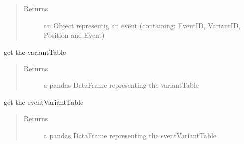 \documentclass[letterpaper,10pt,english]{sphinxmanual}
\begin{document}
\begin{fulllineitems}
\begin{fulllineitems}
\begin{quote}
\begin{description}
\item[{Returns}] \leavevmode
an Object representig an event (containing:  EventID, VariantID, Position and Event)

\end{description}\end{quote}

\end{fulllineitems}


\begin{fulllineitems}
\label{\detokenize{preprocessing:eventLogProcessing.DBTool.DBTool.getVariantTable}}
get the variantTable
\begin{quote}\begin{description}
\item[{Returns}] \leavevmode
a pandas DataFrame representing the variantTable

\end{description}\end{quote}

\end{fulllineitems}


\begin{fulllineitems}
\label{\detokenize{preprocessing:eventLogProcessing.DBTool.DBTool.getEventVariantTable}}
get the eventVariantTable
\begin{quote}\begin{description}
\item[{Returns}] \leavevmode
a pandas DataFrame representing the eventVariantTable

\end{description}\end{quote}

\end{fulllineitems}


\end{fulllineitems}


\begin{DUlineblock}{0em}
\item[] 
\end{DUlineblock}
\end{document}
